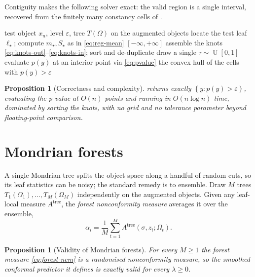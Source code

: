 \documentclass[twoside]{article}
\numberwithin{equation}{section}
\theoremstyle{plain}
\newtheorem{proposition}[theorem]{Proposition}
\theoremstyle{definition}
\theoremstyle{remark}
\DeclareMathOperator{\UnifDist}{U}
\newcommand{\set}[1]{\left\{#1\right\}}
\begin{document}
Contiguity makes the following solver exact: the valid region is a single
interval, recovered from the finitely many constancy cells of .

\begin{algorithm}[t]
\caption{Exact conformal regression interval for a Mondrian tree.}
\label{alg:reg-solver}
\begin{algorithmic}[1]
\Require test object $x_n$, level $\varepsilon$, tree $T(\Omega)$ on the
  augmented objects
\State locate the test leaf $\ell_{\star}$; compute $m_{\star}, S_{\star}$ as in
  \eqref{eq:reg-mean}
  \State \Return $[-\infty, +\infty]$ 
\EndIf
\State assemble the knots \eqref{eq:knots-out}--\eqref{eq:knots-in}; sort and
  de-duplicate
\State draw a single $\tau \sim \UnifDist[0,1]$
  \State evaluate $p(y)$ at an interior point via \eqref{eq:pvalue}
\EndFor
\State \Return the convex hull of the cells with $p(y) > \varepsilon$
\end{algorithmic}
\end{algorithm}

\begin{proposition}[Correctness and complexity]\label{prop:reg-solver}
 returns exactly $\set{y : p(y) > \varepsilon}$,
evaluating the p-value at $O(n)$ points and running in $O(n \log
n)$ time, dominated by sorting the knots, with no grid and no tolerance
parameter beyond floating-point comparison.
\end{proposition}

\section{Mondrian forests}\label{sec:forests}

A single Mondrian tree splits the object space along a handful of random cuts, so its
leaf statistics can be noisy; the standard remedy is to ensemble. Draw $M$
trees $T_1(\Omega_1), \dots, T_{M}(\Omega_{M})$
independently on the augmented objects. Given any leaf-local measure
$A^{\mathrm{tree}}$, the \emph{forest nonconformity measure} averages it over the
ensemble,
\begin{equation}\label{eq:forest-ncm}
  \alpha_i
    = \frac{1}{M} \sum_{t=1}^{M}
      A^{\mathrm{tree}}(\sigma, z_i ; \Omega_t).
\end{equation}

\begin{proposition}[Validity of Mondrian forests]\label{prop:forest-validity}
For every $M \ge 1$ the forest measure \eqref{eq:forest-ncm} is a randomised
nonconformity measure, so the smoothed conformal predictor it defines is exactly
valid for every $\lambda \ge 0$.
\end{proposition}
\end{document}
